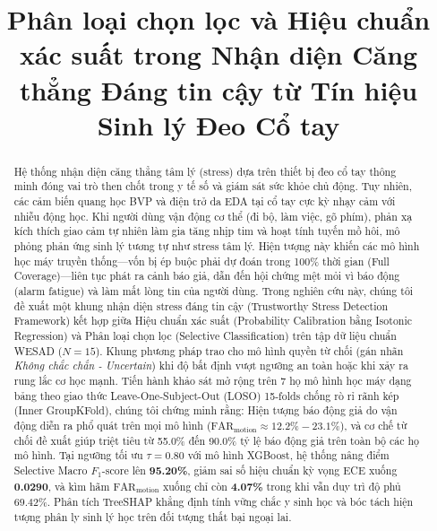 \documentclass[conference]{IEEEtran}
\begin{document}
\title{Phân loại chọn lọc và Hiệu chuẩn xác suất trong Nhận diện Căng thẳng Đáng tin cậy từ Tín hiệu Sinh lý Đeo Cổ tay}

\author{
}

\maketitle

\begin{abstract}
Hệ thống nhận diện căng thẳng tâm lý (stress) dựa trên thiết bị đeo cổ tay thông minh đóng vai trò then chốt trong y tế số và giám sát sức khỏe chủ động. Tuy nhiên, các cảm biến quang học BVP và điện trở da EDA tại cổ tay cực kỳ nhạy cảm với nhiễu động học. Khi người dùng vận động cơ thể (đi bộ, làm việc, gõ phím), phản xạ kích thích giao cảm tự nhiên làm gia tăng nhịp tim và hoạt tính tuyến mồ hôi, mô phỏng phản ứng sinh lý tương tự như stress tâm lý. Hiện tượng này khiến các mô hình học máy truyền thống---vốn bị ép buộc phải dự đoán trong 100\% thời gian (Full Coverage)---liên tục phát ra cảnh báo giả, dẫn đến hội chứng mệt mỏi vì báo động (alarm fatigue) và làm mất lòng tin của người dùng. Trong nghiên cứu này, chúng tôi đề xuất một khung nhận diện stress đáng tin cậy (Trustworthy Stress Detection Framework) kết hợp giữa Hiệu chuẩn xác suất (Probability Calibration bằng Isotonic Regression) và Phân loại chọn lọc (Selective Classification) trên tập dữ liệu chuẩn WESAD ($N=15$). Khung phương pháp trao cho mô hình quyền từ chối (gán nhãn \textit{Không chắc chắn - Uncertain}) khi độ bất định vượt ngưỡng an toàn hoặc khi xảy ra rung lắc cơ học mạnh. Tiến hành khảo sát mở rộng trên 7 họ mô hình học máy dạng bảng theo giao thức Leave-One-Subject-Out (LOSO) 15-folds chống rò rỉ rãnh kép (Inner GroupKFold), chúng tôi chứng minh rằng: Hiện tượng báo động giả do vận động diễn ra phổ quát trên mọi mô hình ($\text{FAR}_{\text{motion}} \approx 12.2\% - 23.1\%$), và cơ chế từ chối đề xuất giúp triệt tiêu từ 55.0\% đến 90.0\% tỷ lệ báo động giả trên toàn bộ các họ mô hình. Tại ngưỡng tối ưu $\tau = 0.80$ với mô hình XGBoost, hệ thống nâng điểm Selective Macro $F_1$-score lên \textbf{95.20\%}, giảm sai số hiệu chuẩn kỳ vọng ECE xuống \textbf{0.0290}, và kìm hãm $\text{FAR}_{\text{motion}}$ xuống chỉ còn \textbf{4.07\%} trong khi vẫn duy trì độ phủ $69.42\%$. Phân tích TreeSHAP khẳng định tính vững chắc y sinh học và bóc tách hiện tượng phân ly sinh lý học trên đối tượng thất bại ngoại lai.
\end{abstract}
\end{document}
